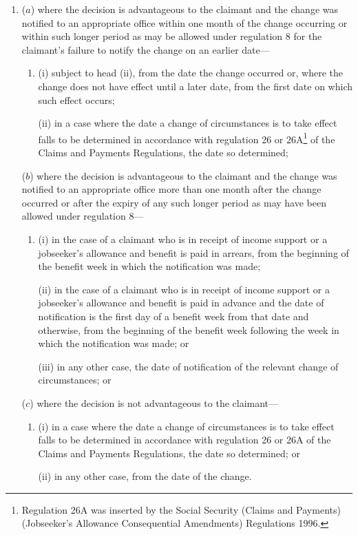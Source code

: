 \documentclass[12pt,a4paper]{article}
\begin{document}
\begin{enumerate}\item[]
($a$) where the decision is advantageous to the claimant and the change was notified to an appropriate office within one month of the change occurring or within such longer period as may be allowed under regulation 8 for the claimant’s failure to notify the change on an earlier date—
\begin{enumerate}\item[]
(i) subject to head (ii), from the date the change occurred or, where the change does not have effect until a later date, from the first date on which such effect occurs;

(ii) in a case where the date a change of circumstances is to take effect falls to be determined in accordance with regulation 26 or 26A\footnote{\frenchspacing Regulation 26A was inserted by the Social Security (Claims and Payments) (Jobseeker’s Allowance Consequential Amendments) Regulations 1996.} of the Claims and Payments Regulations, the date so determined;
\end{enumerate}

($b$) where the decision is advantageous to the claimant and the change was notified to an appropriate office more than one month after the change occurred or after the expiry of any such longer period as may have been allowed under regulation 8—
\begin{enumerate}\item[]
(i) in the case of a claimant who is in receipt of income support or a jobseeker’s allowance and benefit is paid in arrears, from the beginning of the benefit week in which the notification was made;

(ii) in the case of a claimant who is in receipt of income support or a jobseeker’s allowance and benefit is paid in advance and the date of notification is the first day of a benefit week from that date and otherwise, from the beginning of the benefit week following the week in which the notification was made; or

(iii) in any other case, the date of notification of the relevant change of circumstances; or
\end{enumerate}

($c$) where the decision is not advantageous to the claimant—
\begin{enumerate}\item[]
(i) in a case where the date a change of circumstances is to take effect falls to be determined in accordance with regulation 26 or 26A of the Claims and Payments Regulations, the date so determined; or

(ii) in any other case, from the date of the change.
\end{enumerate}
\end{enumerate}
\end{document}
